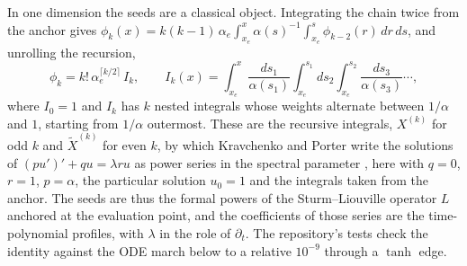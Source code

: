 \documentclass[11pt]{amsart}
\theoremstyle{definition}
\theoremstyle{remark}
\newcommand{\pt}{\partial_t}
\begin{document}
In one dimension the seeds are a classical object. Integrating the chain
twice from the anchor gives
$\phi_k(x) = k (k - 1)\, \alpha_e \int_{x_e}^{x} \alpha(s)^{-1}
\int_{x_e}^{s} \phi_{k-2}(r)\, dr\, ds$, and unrolling the recursion,
\begin{equation}
  \label{eq:nestedint}
  \phi_k = k!\, \alpha_e^{\lceil k/2 \rceil}\, I_k, \qquad
  I_k(x) = \int_{x_e}^{x} \frac{ds_1}{\alpha(s_1)} \int_{x_e}^{s_1} ds_2
  \int_{x_e}^{s_2} \frac{ds_3}{\alpha(s_3)} \cdots,
\end{equation}
where $I_0 = 1$ and $I_k$ has $k$ nested integrals whose weights alternate
between $1/\alpha$ and $1$, starting from $1/\alpha$ outermost. These are
the recursive integrals, $X^{(k)}$ for odd $k$ and $\tilde X^{(k)}$ for even
$k$, by which Kravchenko and Porter write the solutions of $(p u')' + q u =
\lambda r u$ as power series in the spectral parameter
\cite{Kravchenko2008,KravchenkoPorter2010}, here with $q = 0$, $r = 1$,
$p = \alpha$, the particular solution $u_0 = 1$ and the integrals taken
from the anchor. The seeds are thus the formal powers of the
Sturm--Liouville operator $L$ anchored at the evaluation point, and the
coefficients of those series are the time-polynomial profiles, with
$\lambda$ in the role of $\pt$. The repository's tests check the identity
against the ODE march below to a relative $10^{-9}$ through a $\tanh$ edge.
\end{document}
